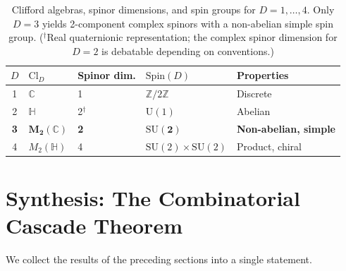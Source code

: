 \documentclass[11pt]{article}
\newcommand{\Z}{\mathbb{Z}}
\newcommand{\Cl}{\mathrm{Cl}}
\newcommand{\Spin}{\mathrm{Spin}}
\newcommand{\SU}{\mathrm{SU}}
\begin{document}
\begin{table}[h]
\centering
\begin{tabular}{cllll}
\toprule
$D$ & $\Cl_D$ & Spinor dim. & $\Spin(D)$ & Properties \\
\midrule
1 & $\mathbb{C}$ & 1 & $\Z/2\Z$ & Discrete \\
2 & $\mathbb{H}$ & 2$^\dagger$ & $\mathrm{U}(1)$ & Abelian \\
\textbf{3} & $\mathbf{M_2(\mathbb{C})}$ & \textbf{2} & $\mathbf{\SU(2)}$ & \textbf{Non-abelian, simple} \\
4 & $M_2(\mathbb{H})$ & 4 & $\SU(2) \times \SU(2)$ & Product, chiral \\
\bottomrule
\end{tabular}
\caption{Clifford algebras, spinor dimensions, and spin groups for $D = 1, \ldots, 4$.
Only $D = 3$ yields 2-component complex spinors with a non-abelian simple spin group.
($^\dagger$Real quaternionic representation; the complex spinor dimension for $D = 2$ is debatable depending on conventions.)}
\label{tab:clifford}
\end{table}

\section{Synthesis: The Combinatorial Cascade Theorem}
\label{sec:synthesis}

We collect the results of the preceding sections into a single statement.
\end{document}
